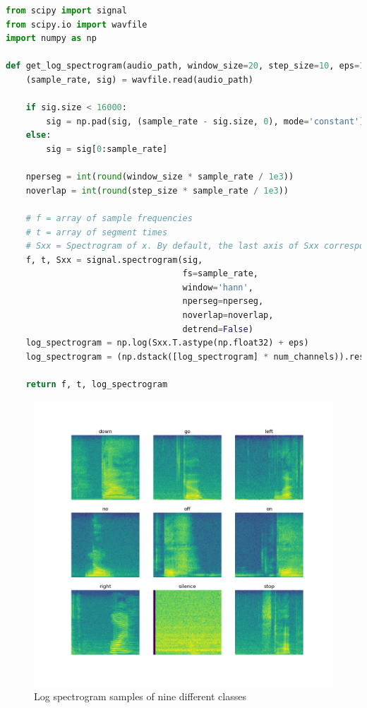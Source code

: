 \documentclass{article}
\theoremstyle{definition}
\theoremstyle{remark}
\begin{document}
\begin{lstlisting}[language=Python, caption=Get log spectrogram code, label=code:log_spectrograms]
from scipy import signal
from scipy.io import wavfile
import numpy as np

def get_log_spectrogram(audio_path, window_size=20, step_size=10, eps=1e-10, num_channels=1):
    (sample_rate, sig) = wavfile.read(audio_path)

    if sig.size < 16000:
        sig = np.pad(sig, (sample_rate - sig.size, 0), mode='constant')
    else:
        sig = sig[0:sample_rate]

    nperseg = int(round(window_size * sample_rate / 1e3))
    noverlap = int(round(step_size * sample_rate / 1e3))

    # f = array of sample frequencies
    # t = array of segment times
    # Sxx = Spectrogram of x. By default, the last axis of Sxx corresponds to the segment times.
    f, t, Sxx = signal.spectrogram(sig,
                                   fs=sample_rate,
                                   window='hann',
                                   nperseg=nperseg,
                                   noverlap=noverlap,
                                   detrend=False)
    log_spectrogram = np.log(Sxx.T.astype(np.float32) + eps)
    log_spectrogram = (np.dstack([log_spectrogram] * num_channels)).reshape(99, 161, -1)  

    return f, t, log_spectrogram
\end{lstlisting}


\begin{figure}[h!]
    \centering
    \includegraphics[width=1\textwidth]{img/9_log_spectrograms.png}
    \caption{Log spectrogram samples of nine different classes}
    \label{fig:log_spectrograms}
\end{figure}
\end{document}
